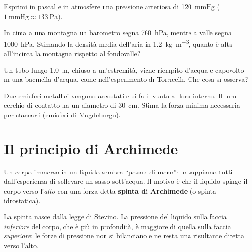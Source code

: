 \begin{esercizio}
Esprimi in pascal e in atmosfere una pressione arteriosa di \SI{120}{\mmHg} ($\SI{1}{\mmHg} \approx \SI{133}{\pascal}$).\\
\end{esercizio}

\begin{esercizio}
In cima a una montagna un barometro segna \SI{760}{\hecto\pascal}, mentre a valle segna \SI{1000}{\hecto\pascal}. Stimando la densità media dell'aria in \SI{1,2}{\kilo\gram\per\metre\cubed}, quanto è alta all'incirca la montagna rispetto al fondovalle?\\
\end{esercizio}

\begin{esercizio}
Un tubo lungo \SI{1,0}{\metre}, chiuso a un'estremità, viene riempito d'acqua e capovolto in una bacinella d'acqua, come nell'esperimento di Torricelli. Che cosa si osserva?\\
\end{esercizio}

\begin{esercizio}
Due emisferi metallici vengono accostati e si fa il vuoto al loro interno. Il loro cerchio di contatto ha un diametro di \SI{30}{\centi\metre}. Stima la forza minima necessaria per staccarli (emisferi di Magdeburgo).\\
\end{esercizio}


\section{Il principio di Archimede}

Un corpo immerso in un liquido sembra ``pesare di meno'': lo sappiamo tutti dall'esperienza di sollevare un sasso sott'acqua. Il motivo è che il liquido spinge il corpo verso l'\emph{alto} con una forza detta \textbf{spinta di Archimede} (o spinta idrostatica).

La spinta nasce dalla legge di Stevino. La pressione del liquido sulla faccia \emph{inferiore} del corpo, che è più in profondità, è maggiore di quella sulla faccia \emph{superiore}: le forze di pressione non si bilanciano e ne resta una risultante diretta verso l'alto.

